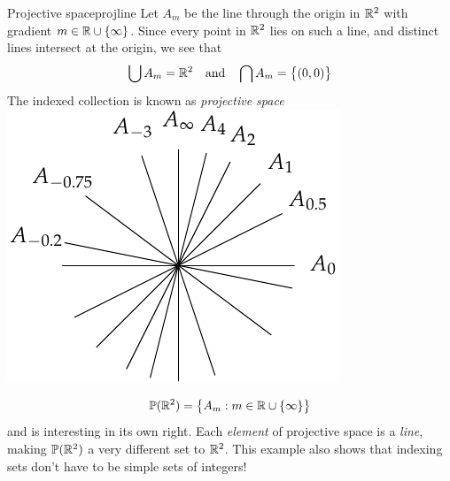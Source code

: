 \begin{example}[lower separated=false, sidebyside, sidebyside align=top seam, sidebyside gap=0pt, righthand width=0.3\linewidth]{Projective space}{projline}
	Let $A_m$ be the line\footnotemark{} through the origin in $\mathbb{R}^2$ with gradient $m\in\mathbb{R}\cup\{\infty\}$. 	Since every point in $\mathbb{R}^2$ lies on such a line, and distinct lines intersect at the origin, we see that
	\[
		\bigcup A_m=\mathbb{R}^2 \quad \text{and} \quad \bigcap A_m=\bigl\{(0,0)\bigr\}
	\]
  The indexed collection is known as \emph{projective space} 
  \tcblower
	\hfill\includegraphics[scale=0.85]{setsii-03-projective}
\end{example}

\vspace*{-45pt}

\begin{tcolorbox}[exstyle]
	\[
  	\mathbb{P}(\mathbb{R}^2)=\bigl\{A_m:m\in \mathbb{R}\cup\{\infty\}\bigr\}
  \]
	and is interesting in its own right. Each \emph{element} of projective space is a \emph{line}, making $\mathbb{P}(\mathbb{R}^2)$ a very different set to $\mathbb{R}^2$. This example also shows that indexing sets don't have to be simple sets of integers! %
\end{tcolorbox}


